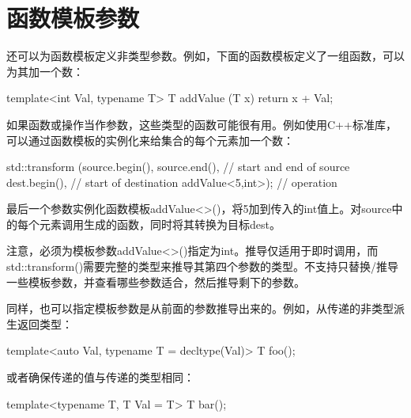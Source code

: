 \section{函数模板参数}
还可以为函数模板定义非类型参数。例如，下面的函数模板定义了一组函数，可以为其加一个数：

\begin{cpp}
template<int Val, typename T>
T addValue (T x) {
	return x + Val;
}
\end{cpp}

如果函数或操作当作参数，这些类型的函数可能很有用。例如使用C++标准库，可以通过函数模板的实例化来给集合的每个元素加一个数：

\begin{cpp}
std::transform (source.begin(), source.end(), // start and end of source
dest.begin(), // start of destination
addValue<5,int>); // operation
\end{cpp}

最后一个参数实例化函数模板addValue<>()，将5加到传入的int值上。对source中的每个元素调用生成的函数，同时将其转换为目标dest。

注意，必须为模板参数addValue<>()指定为int。推导仅适用于即时调用，而std::transform()需要完整的类型来推导其第四个参数的类型。不支持只替换/推导一些模板参数，并查看哪些参数适合，然后推导剩下的参数。

同样，也可以指定模板参数是从前面的参数推导出来的。例如，从传递的非类型派生返回类型：

\begin{cpp}
template<auto Val, typename T = decltype(Val)>
T foo();
\end{cpp}

或者确保传递的值与传递的类型相同：

\begin{cpp}
template<typename T, T Val = T{}>
T bar();
\end{cpp}































